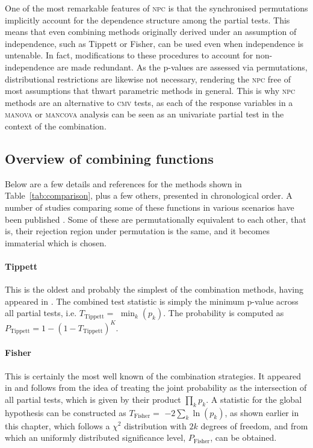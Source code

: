 One of the most remarkable features of \textsc{npc} is that the synchronised permutations implicitly account for the dependence structure among the partial tests. This means that even combining methods originally derived under an assumption of independence, such as Tippett or Fisher, can be used even when independence is untenable. In fact, modifications to these procedures to account for non-independence \citep[e.g.,][for the Fisher method]{Brown1975, Kost2002} are made redundant. As the p-values are assessed via permutations, distributional restrictions are likewise not necessary, rendering the \textsc{npc} free of most assumptions that thwart parametric methods in general. This is why \textsc{npc} methods are an alternative to \textsc{cmv} tests, as each of the response variables in a \textsc{manova} or \textsc{mancova} analysis can be seen as an univariate partial test in the context of the combination.

\subsection{Overview of combining functions}

Below are a few details and references for the methods shown in Table~\ref{tab:comparison}, plus a few others, presented in chronological order. A number of studies comparing some of these functions in various scenarios have been published \citep{Birnbaum1954, vanZwet1967, Oosterhoff1969, Rosenthal1978, Berk1979, Westberg1985, Lazar2002, Loughin2004, Whitlock2005, Wu2006, Won2009, Bhandary2011, Chen2011_evo, Zaykin2011, Chang2013}. Some of these are permutationally equivalent to each other, that is, their rejection region under permutation is the same, and it becomes immaterial which is chosen.

\paragraph{Tippett} This is the oldest and probably the simplest of the combination methods, having appeared in \citet{Tippett1931}. The combined test statistic is simply the minimum p-value across all partial tests, i.e. $T_{\text{Tippett}} =$ $\min_{k} \left(p_{k}\right)$. The probability is computed as $P_{\text{Tippett}} = 1-\left(1-T_{\text{Tippett}}\right)^{K}$.

\paragraph{Fisher} This is certainly the most well known of the combination strategies. It appeared in \citet{Fisher1932} and follows from the idea of treating the joint probability as the intersection of all partial tests, which is given by their product $\prod_{k} p_{k}$. A statistic for the global hypothesis can be constructed as $T_{\text{Fisher}} =$ $-2 \sum_{k} \ln\left(p_{k}\right)$, as shown earlier in this chapter, which follows a $\chi^2$ distribution with $2k$ degrees of freedom, and from which an uniformly distributed significance level, $P_{\text{Fisher}}$, can be obtained.

